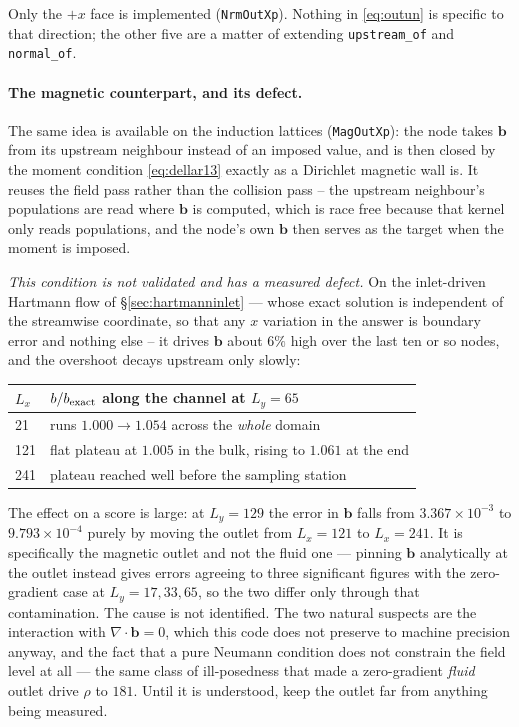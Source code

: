 \documentclass[11pt,a4paper]{article}
\newcommand{\bb}{\bm{b}}
\newcommand{\e}[1]{\times 10^{#1}}
\begin{document}
\medskip
\noindent Only the $+x$ face is implemented (\texttt{NrmOutXp}). Nothing in
\eqref{eq:outun} is specific to that direction; the other five are a matter of
extending \texttt{upstream\_of} and \texttt{normal\_of}.

\paragraph{The magnetic counterpart, and its defect.} The same idea is
available on the induction lattices (\texttt{MagOutXp}): the node takes $\bb$
from its upstream neighbour instead of an imposed value, and is then closed by
the moment condition \eqref{eq:dellar13} exactly as a Dirichlet magnetic wall
is. It reuses the field pass rather than the collision pass -- the upstream
neighbour's populations are read where $\bb$ is computed, which is race free
because that kernel only reads populations, and the node's own $\bb$ then serves
as the target when the moment is imposed.

\emph{This condition is not validated and has a measured defect.} On the
inlet-driven Hartmann flow of \S\ref{sec:hartmanninlet} --- whose exact solution
is independent of the streamwise coordinate, so that any $x$ variation in the
answer is boundary error and nothing else -- it drives $\bb$ about $6\%$ high
over the last ten or so nodes, and the overshoot decays upstream only slowly:
\begin{center}\small
\begin{tabular}{ll}
\toprule
$L_x$ & $b/b_{\rm exact}$ along the channel at $L_y=65$ \\
\midrule
21  & runs $1.000 \to 1.054$ across the \emph{whole} domain \\
121 & flat plateau at $1.005$ in the bulk, rising to $1.061$ at the end \\
241 & plateau reached well before the sampling station \\
\bottomrule
\end{tabular}
\end{center}
\noindent The effect on a score is large: at $L_y=129$ the error in $\bb$ falls
from $3.367\e{-3}$ to $9.793\e{-4}$ purely by moving the outlet from $L_x=121$
to $L_x=241$. It is specifically the magnetic outlet and not the fluid one ---
pinning $\bb$ analytically at the outlet instead gives errors agreeing to three
significant figures with the zero-gradient case at $L_y=17,33,65$, so the two
differ only through that contamination. The cause is not identified. The two
natural suspects are the interaction with $\nabla\!\cdot\!\bb=0$, which this code
does not preserve to machine precision anyway, and the fact that a pure Neumann
condition does not constrain the field level at all --- the same class of
ill-posedness that made a zero-gradient \emph{fluid} outlet drive $\rho$ to
$181$. Until it is understood, keep the outlet far from anything being measured.
\end{document}
